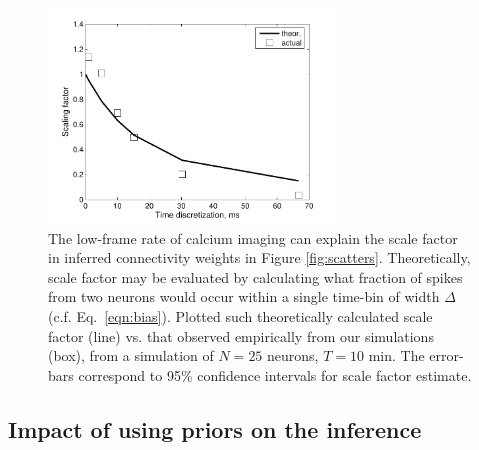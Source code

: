 \begin{figure}[h]
\centering
\includegraphics[width=3in]{../figs/FigureA4_scale_bias}
\caption{The low-frame rate of calcium imaging can explain the scale factor in inferred connectivity weights in Figure \ref{fig:scatters}.  Theoretically, scale factor may be evaluated by calculating what fraction of spikes from two neurons would occur within a single time-bin of width $\Delta$ (c.f. Eq.~\eqref{eqn:bias}).  
Plotted such theoretically calculated scale factor (line) vs. that observed empirically from our simulations (box), from a simulation of $N=25$ neurons, $T=10$ min.
The error-bars correspond to 95\% confidence intervals for scale factor estimate.}
\label{fig:bias}
\end{figure}

\subsection{Impact of using priors on the inference}

